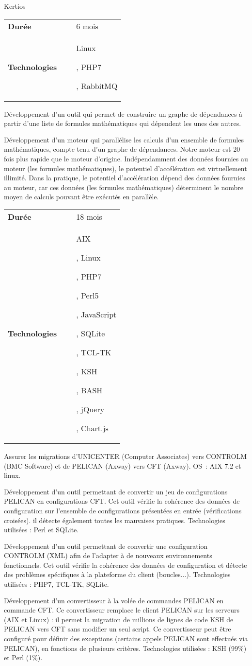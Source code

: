 \documentclass{cv}
\newlength{\companySectionIndentLength}
\newlength{\interSectionTitleContentLength}
\newcommand{\fontTechnoDef}{\setmainfont[Ligatures=TeX]{Ubuntu Mono}}
\newenvironment{sectionComponent}{
   \vspace{\interSectionTitleContentLength}\par%
}{%
   \par%
}%
\newcommand{\realisationHeader}[2]{
   \vspace{10pt}\par%
   \begin{tcolorbox}[notitle,
                     nobeforeafter, %
                     bottomrule=0pt,
                     toprule=0pt,
                     leftrule=2pt,
                     rightrule=0pt,
                     top=0pt,
                     bottom=0pt,
                     halign=left,
                     left=0pt,
                     valign=center,
                     width=\textwidth,
                     colback=white]%
      \begin{packed_tabular}%
         \begin{tabular}{lll}%
            \textbf{Durée}        & ~ & #1 \\
            \textbf{Technologies} & ~ & #2 \\
         \end{tabular}%
      \end{packed_tabular}%
   \end{tcolorbox}%
   \par%
}%
\newcommand{\sectionCompany}[1]{ 
   \vspace{\interSectionTitleContentLength}\par%
   \hspace{\companySectionIndentLength}\begin{tcolorbox}[notitle,
                      nobeforeafter, %
                      bottomrule=2pt,
                      toprule=0pt,
                      leftrule=0pt,
                      rightrule=0pt,
                      top=0pt,
                      bottom=0pt,
                      halign=left,
                      left=0pt,
                      valign=center,
                      colback={colorCompanySection},
                      width=\textwidth-\companySectionIndentLength]%
       #1%
   \end{tcolorbox}%
   \par%
}%
\newenvironment{technoEnv}{%
   \fontTechnoDef
}{}
\newcommand{\techno}[1]{%
   \begin{technoEnv}%
   #1%
   \end{technoEnv}\par%
}
\newenvironment{packed_tabular}{
   \setlength{\tabcolsep}{0pt}
}{}
\newenvironment{realisationEnv}{
   \setlength{\parskip}{1em}
}{%
   \par%
}
\begin{document}
   \begin{sectionComponent}
      \sectionCompany{Kertios}
   
      \realisationHeader{6 mois}{\techno{Linux}, \techno{PHP7}, \techno{RabbitMQ}}
   
      \begin{realisationEnv}
         Développement d'un outil qui permet de construire un graphe de dépendances à partir d'une liste de formules mathématiques qui dépendent les
         unes des autres.
   
         Développement d'un moteur qui parallélise les calculs d'un ensemble de formules mathématiques, compte tenu d'un graphe de dépendances.
         Notre moteur est 20 fois plus rapide que le moteur d'origine. Indépendamment des données fournies au moteur (les formules mathématiques),
         le potentiel d'accélération est virtuellement illimité. Dans la pratique, le potentiel d'accélération dépend des données fournies au moteur,
         car ces données (les formules mathématiques) déterminent le nombre moyen de calculs pouvant être exécutés en parallèle.
      \end{realisationEnv}
   
      \realisationHeader{18 mois}{\techno{AIX}, \techno{Linux}, \techno{PHP7}, \techno{Perl5}, \techno{JavaScript}, \techno{SQLite}, \techno{TCL-TK}, \techno{KSH}, \techno{BASH}, \techno{jQuery}, \techno{Chart.js}}
   
      \begin{realisationEnv}
         Assurer les migrations d'UNICENTER (Computer Associates) vers CONTROLM (BMC Software) et de PELICAN (Axway) vers CFT (Axway). OS : AIX 7.2
         et linux.
   
         Développement d'un outil permettant de convertir un jeu de configurations PELICAN en configurations CFT. Cet outil vérifie la cohérence des
         données de configuration sur l'ensemble de configurations présentées en entrée (vérifications croisées). il détecte également toutes les
         mauvaises pratiques. Technologies utilisées : Perl et SQLite.
   
         Développement d'un outil permettant de convertir une configuration CONTROLM (XML) afin de l'adapter à de nouveaux environnements fonctionnels.
         Cet outil vérifie la cohérence des données de configuration et détecte des problèmes spécifiques à la plateforme du client (boucles...).
         Technologies utilisées : PHP7, TCL-TK, SQLite.
   
         Développement d'un convertisseur à la volée de commandes PELICAN en commande CFT. Ce convertisseur remplace le client PELICAN sur les serveurs
         (AIX et Linux) : il permet la migration de millions de lignes de code KSH de PELICAN vers CFT sans modifier un seul script. Ce convertisseur
         peut être configuré pour définir des exceptions (certains appels PELICAN sont effectués via PELICAN), en fonctions de plusieurs critères.
         Technologies utilisées : KSH (99\%) et Perl (1\%). 
   

\end{realisationEnv}
\end{sectionComponent}
\end{document}
